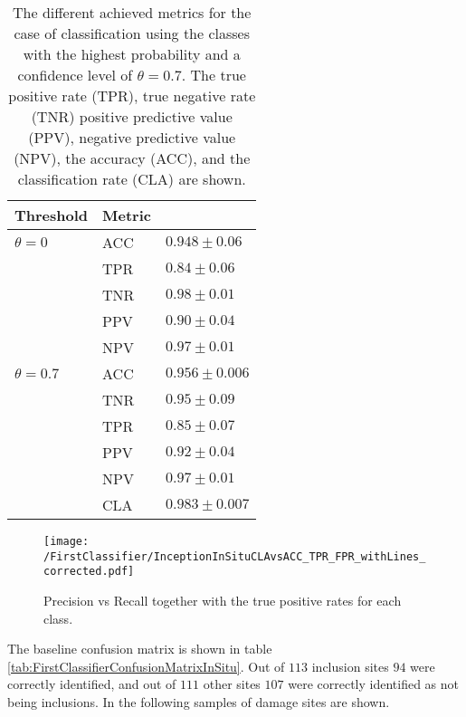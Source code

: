 
\begin{table}[H]
 \begin{center}
  \begin{tabular}{@{} *3l @{}} \toprule[2pt]
   Threshold & Metric &   \\ \midrule
   $\theta=0$ & ACC & $0.948\pm0.06$ \\
   &TPR  & $0.84\pm 0.06$ \\
   &TNR  & $0.98\pm 0.01$ \\
   &PPV  & $0.90\pm0.04$ \\
   &NPV  & $0.97\pm0.01$ \\ \midrule
   $\theta=0.7$& ACC & $0.956 \pm 0.006$ \\
   &TNR  & $0.95\pm 0.09$ \\
   &TPR  & $0.85\pm 0.07$ \\
   &PPV  & $0.92\pm 0.04$ \\
   &NPV  & $0.97 \pm0.01$ \\ 
   &CLA  & $0.983\pm 0.007$ \\ \bottomrule[2pt]
  \end{tabular}
 \end{center}
 \caption{{The different achieved metrics for the case of classification using the classes with the highest probability and a confidence level of $\theta =0.7$. The true positive rate (TPR), true negative rate (TNR) positive predictive value (PPV), negative predictive value (NPV), the accuracy (ACC), and the classification rate (CLA) are shown.}}
   \label{tab:FirstClassifierMetrics}
\end{table}

\begin{figure}[H]
\texttt{[image: /FirstClassifier/InceptionInSituCLAvsACC\_TPR\_FPR\_withLines\_corrected.pdf]}
\caption{Precision vs Recall together with the true positive rates for each class. }
\label{fig:FirstClassifierInSitu}
\end{figure}

The baseline confusion matrix is shown in table \ref{tab:FirstClassifierConfusionMatrixInSitu}. Out of $113$ inclusion sites $94$ were correctly identified, and out of $111$ other sites $107$ were correctly identified as not being inclusions. In the following samples of damage sites are shown.

